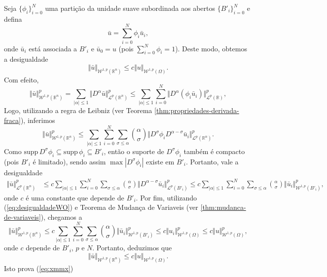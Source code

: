 \documentclass[a4paper, 11pt]{book}
\theoremstyle{definition}
\newcommand{\bR}{\mathbb{R}}
\newcommand{\cL}{\mathcal{L}}
\newcommand{\cW}{\mathcal{W}}
\newcommand{\supp}{\mathrm{supp}\,}
\begin{document}
\begin{prf}
    Seja $\{\phi_i\}_{i=0}^N$ uma partição da unidade suave subordinada aos abertos $\{B'_i\}_{i=0}^N$ e defina
    \begin{equation}
        \bar u = \sum_{i=0}^N \phi_i \bar u_i,
    \end{equation}
    onde $\bar u_i$ está associada a $B'_i$ e $\bar u_0 = u$ (pois $\sum_{i=0}^N \phi_i = 1$). Deste modo, obtemos a desigualdade
    \begin{equation} \label{eq:xmmx}
        \Vert \bar u \Vert_{\cW^{1,p}(\bR^n)} \leqslant c \Vert u \Vert_{\cW^{1,p}(\Omega)}.
    \end{equation}
    Com efeito,
    \[
        \Vert \bar u \Vert^p_{\cW^{1,p}(\bR^n)} = \sum_{|\alpha| \leqslant 1} \Vert D^\alpha \bar u \Vert^p_{\cL^p(\bR^n)}
        \leqslant \sum_{|\alpha| \leqslant 1} \sum_{i=0}^N \Vert D^\alpha (\phi_i \bar u_i) \Vert_{\cL^p(\bR)}^p,
    \]
    Logo, utilizando a regra de Leibniz (ver Teorema \ref{thm:propriedades-derivada-fraca}), inferimos
    \[
        \Vert \bar u \Vert_{\cW^{1,p}(\bR^n)}^p \leqslant \sum_{|\alpha| \leqslant 1} \sum_{i=0}^{N} \sum_{\sigma \leqslant \alpha} \binom{\alpha}{\sigma} \Vert D^\sigma \phi_i D^{\alpha - \sigma} \bar u_i \Vert_{\cL^p(\bR^n)}^p.
    \]
    Como $\supp D^\sigma \phi_i \subseteq \supp \phi_i \subseteq B'_i$, então o suporte de $D^\sigma \phi_i$ também é compacto (pois $B'_i$ é limitado), sendo assim $\max |D^\sigma \phi_i|$ existe em $B'_i$.
    Portanto, vale a desigualdade
    \[
        \begin{aligned}
            \Vert \bar u \Vert_{\cL^p(\bR^n)}^p &\leqslant c\sum_{|\alpha| \leqslant 1} \sum_{i=0}^{N} \sum_{\sigma \leqslant \alpha} \binom{\alpha}{\sigma} \Vert D^{\alpha - \sigma} \bar u_i \Vert_{\cL^p(B'_i)}^p \leqslant c\sum_{|\alpha| \leqslant 1} \sum_{i=0}^{N} \sum_{\sigma \leqslant \alpha} \binom{\alpha}{\sigma} \Vert \bar u_i \Vert_{\cW^{1,p}(B'_i)}^p,
        \end{aligned}
    \]
    onde $c$ é uma constante que depende de $B'_i$.
    Por fim, utilizando (\ref{eq:desigualdadeWO}) e Teorema de Mudança de Variaveis (ver \ref{thm:mudanca-de-variaveis}), chegamos a
    \[
         \Vert \bar u \Vert^p_{\cW^{1,p}(\bR^n)} \leqslant c\sum_{|\alpha| \leqslant 1} \sum_{i=0}^{N} \sum_{\sigma \leqslant \alpha} \binom{\alpha}{\sigma} \Vert \bar u_i \Vert_{\cW^{1,p}(B'_i)}^p \leqslant c\Vert u_i \Vert_{\cW^{1,p}(\Omega)}^p \leqslant c \Vert u \Vert_{\cW^{1,p}(\Omega)}^p,
    \]
    onde $c$ depende de $B'_i$, $p$ e $N$.
    Portanto, deduzimos que
    \begin{equation} \label{eq:Mm}
        \Vert \bar u \Vert_{\cW^{1,p}(\bR^n)} \leqslant c \Vert u \Vert_{\cW^{1,p}(\Omega)}.
    \end{equation}
    Isto prova (\ref{eq:xmmx})


\end{prf}
\end{document}
